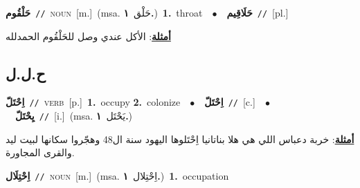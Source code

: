 \documentclass[10pt,a4paper,twoside]{article} %
\begin{document}
\begin{multicols}{2}
{\setlength\topsep{0pt}\textbf{\foreignlanguage{arabic}{حَلْقُوم}}\ {\color{gray}\texttt{//}\color{black}}\ \textsc{noun}\ [m.]\ \color{gray}(msa. \foreignlanguage{arabic}{حَلْق}~\foreignlanguage{arabic}{\textbf{١.}})\color{black}\ \textbf{1.}~throat\ \ $\bullet$\ \ \setlength\topsep{0pt}\textbf{\foreignlanguage{arabic}{حَلَاقِيم}}\ {\color{gray}\texttt{//}\color{black}}\ [pl.]\  \begin{flushright}\color{gray}\foreignlanguage{arabic}{\textbf{\underline{\foreignlanguage{arabic}{أمثلة}}}: الأكل عندي وصل للحَلْقُوم الحمدلله}\end{flushright}\color{black}} \vspace{2mm}

\vspace{-3mm}
\subsection*{\color{blue}\foreignlanguage{arabic}{ح.ل.ل}\color{blue}{}} 

{\setlength\topsep{0pt}\textbf{\foreignlanguage{arabic}{اِحْتَلّ}}\ {\color{gray}\texttt{//}\color{black}}\ \textsc{verb}\ [p.]\ \textbf{1.}~occupy  \textbf{2.}~colonize\ \ $\bullet$\ \ \setlength\topsep{0pt}\textbf{\foreignlanguage{arabic}{اِحْتَلّ}}\ {\color{gray}\texttt{//}\color{black}}\ [c.]\ \ $\bullet$\ \ \setlength\topsep{0pt}\textbf{\foreignlanguage{arabic}{يِحْتَلّ}}\ {\color{gray}\texttt{//}\color{black}}\ [i.]\ \color{gray}(msa. \foreignlanguage{arabic}{يَحْتَل}~\foreignlanguage{arabic}{\textbf{١.}})\color{black}\  \begin{flushright}\color{gray}\foreignlanguage{arabic}{\textbf{\underline{\foreignlanguage{arabic}{أمثلة}}}: خربة دعباس اللي هي هلا بناتانيا اِحْتَلوها اليهود سنة ال48 وهجّروا سكانها لبيت ليد والقرى المجاورة.}\end{flushright}\color{black}} \vspace{2mm}

{\setlength\topsep{0pt}\textbf{\foreignlanguage{arabic}{اِحْتِلَال}}\ {\color{gray}\texttt{//}\color{black}}\ \textsc{noun}\ [m.]\ \color{gray}(msa. \foreignlanguage{arabic}{اِحْتِلال}~\foreignlanguage{arabic}{\textbf{١.}})\color{black}\ \textbf{1.}~occupation\ } \vspace{2mm}


\end{multicols}
\end{document}
